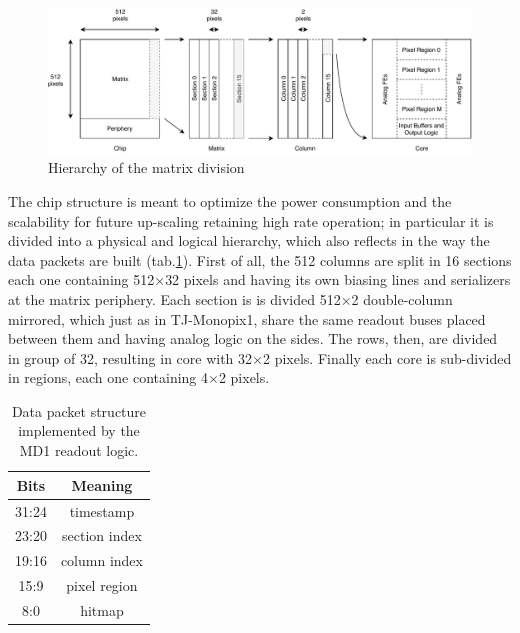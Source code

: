         \begin{figure}[h!]
            \centering
            \includegraphics[width=.98\linewidth]{figures/ARCADIA/hierarchy.pdf}
            \caption{Hierarchy of the matrix division}
            \label{fig:hierarchy}
        \end{figure}
        The chip structure is meant to optimize the power consumption and the scalability for future up-scaling retaining high rate operation; in particular it is divided into a physical and logical hierarchy, which also reflects in the way the data packets are built (tab.\ref{tab:data_packet}).
        First of all, the 512 columns are split in 16 sections each one containing 512$\times$32 pixels and having its own biasing lines and serializers at the matrix periphery. 
        Each section is is divided 512$\times$2 double-column mirrored, which just as in TJ-Monopix1, share the same readout buses placed between them and having analog logic on the sides.        
        The rows, then, are divided in group of 32, resulting in core with 32$\times$2 pixels. Finally each core is sub-divided in regions, each one containing 4$\times$2 pixels. 
        \begin{table}
            \begin{center}
            \begin{tabular}{|c |c |}
            \hline
            Bits & Meaning  \\
            \hline
            \hline
            31:24 & timestamp\\
            23:20 & section index\\
            19:16 & column index\\
            15:9 & pixel region\\
            8:0 & hitmap\\
            \hline
            \end{tabular}
            \caption{Data packet structure implemented by the MD1 readout logic.}
            \label{tab:data_packet}
            \end{center}
        \end{table}

